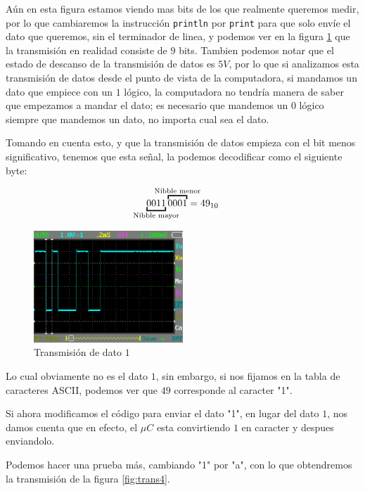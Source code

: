 		Aún en esta figura estamos viendo mas bits de los que realmente queremos medir, por lo que cambiaremos la instrucción \texttt{println} por \texttt{print} para que solo envíe el dato que queremos, sin el terminador de linea, y podemos ver en la figura \ref{fig:trans3} que la transmisión en realidad consiste de $9$ bits. Tambien podemos notar que el estado de descanso de la transmisión de datos es $5V$, por lo que si analizamos esta transmisión de datos desde el punto de vista de la computadora, si mandamos un dato que empiece con un $1$ lógico, la computadora no tendría manera de saber que empezamos a mandar el dato; es necesario que mandemos un $0$ lógico siempre que mandemos un dato, no importa cual sea el dato.

		Tomando en cuenta esto, y que la transmisión de datos empieza con el bit menos significativo, tenemos que esta señal, la podemos decodificar como el siguiente byte:

		\begin{equation}
			 \underbracket{0011}_{\mathclap{\text{Nibble mayor}}} \overbracket{0001}^{\mathclap{\text{Nibble menor}}} = 49_{10}
		\end{equation}

		\begin{figure}
			\begin{center}
				\includegraphics[width=0.5\textwidth]{images/110msz.pdf}
				\caption{Transmisión de dato $1$}
				\label{fig:trans3}
			\end{center}
		\end{figure}

		Lo cual obviamente no es el dato $1$, sin embargo, si nos fijamos en la tabla de caracteres ASCII, podemos ver que $49$ corresponde al caracter "1".

		Si ahora modificamos el código para enviar el dato "1", en lugar del dato $1$, nos damos cuenta que en efecto, el $\mu C$ esta convirtiendo $1$ en caracter y despues enviandolo.

		Podemos hacer una prueba más, cambiando "1" por "a", con lo que obtendremos la transmisión de la figura \ref{fig:trans4}.

